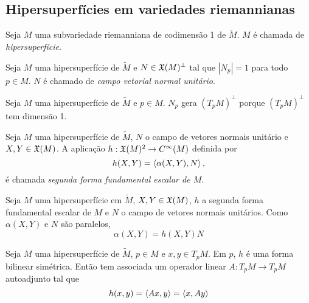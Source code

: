 \subsection{Hipersuperfícies em variedades riemannianas}

\begin{definicao}
	Seja $M$ uma subvariedade riemanniana de codimensão 1 de $\tilde{M}$. $M$ é chamada de \emph{hipersuperfície}.
\end{definicao}

\begin{definicao}
	Seja $M$ uma hipersuperfície de $\tilde{M}$ e
	$N \in \mathfrak{X}(M)^\perp$ tal que $|N_p|=1$ para todo $p \in M$.
	$N$ é chamado de \emph{campo vetorial normal unitário}.
\end{definicao}
	
\begin{observacao}
	Seja $M$ uma hipersuperfície de $\tilde{M}$ e 
	$p \in M$.
	$N_p$ gera $\left(T_p M\right)^\perp$ porque $\left(T_p M\right)^\perp$ tem dimensão 1.
\end{observacao}

\begin{definicao}
	Seja $M$ uma hipersuperfície de $\tilde{M}$,
	$N$ o campo de vetores normais unitário e
	$X,Y \in \mathfrak{X}(M)$.
	A aplicação $h: \mathfrak{X}(M)^2 \rightarrow C^\infty(M)$ definida por
	\begin{equation*}
		h(X,Y) = \left\langle \alpha(X,Y),N \right\rangle,
	\end{equation*}
	é chamada \emph{segunda forma fundamental escalar de $M$}.
\end{definicao}

\begin{observacao}
	Seja $M$ uma hipersuperfície em $\tilde{M}$,
	$X,Y \in \mathfrak{X}(M)$,
	$h$ a segunda forma fundamental escalar de $M$ e
	$N$ o campo de vetores normais unitários.
	Como $\alpha(X,Y)$ e $N$ são paralelos,
	\begin{equation*}
		\alpha(X,Y) = h(X,Y) N
	\end{equation*}
\end{observacao}

\begin{observacao}
	Seja $M$ uma hipersuperfície de $\tilde{M}$,
	$p \in M$ e 
	$x,y \in T_p M$.
	Em $p$, $h$ é uma forma bilinear simétrica.
	Então tem associada um operador linear $A: T_p M \rightarrow T_p M$ autoadjunto tal que
	\begin{equation*}
		h(x,y) = \left\langle Ax,y \right\rangle = \left\langle x,Ay \right\rangle
	\end{equation*}
\end{observacao}

